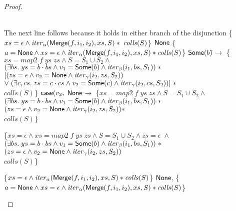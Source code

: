 \begin{proof}
\begin{itemize}
\begin{specification}
\\ \> \>     The next line follows because it holds in either branch of the disjunction 
\nextline \> \{$xs = \epsilon \land \mathit{iter}_\alpha(\mathsf{Merge}(f, i_1, i_2), xs, S)
               * \; \mathit{colls}(S)$\}
\nextline \> $\mathsf{None}$ 
\nextline \> \{$a = \mathsf{None} \land xs = \epsilon \land \mathit{iter}_\alpha(\mathsf{Merge}(f, i_1, i_2), xs, S)
               * \mathit{colls}(S) $\}
\nextline \;\;\;$\mathsf{Some}(b)$\=$ \to $ 
\nextline \> \{$xs = \mathit{map2}\;f\;ys\;zs \land 
                  S = S_1 \cup S_2 \land$ 
\\ \> \>\;\;    $(\exists bs.\; ys = b\cdot bs \land v_1 = \mathsf{Some}(b) \land 
                                \mathit{iter}_\beta(i_1, bs, S_1)) \;*$ 
\\ \> \>\;     $[(zs = \epsilon \land v_2 = \mathsf{None} \land \mathit{iter}_\gamma(i_2, zs, S_2))$ 
\\ \> \>\;\;    $\vee\; (\exists c, cs.\; zs = c\cdot cs \land v_2 = \mathsf{Some}(c) \land 
                                \mathit{iter}_\gamma(i_2, cs, S_2))] \;*$ 
\\ \> \>\;     $\mathit{colls}(S)$\}
\nextline \> $\mathsf{case}(v_2,$ 
\nextline \> \;\;\; $\mathsf{None}$\=$\to$ 
\nextline \> \> \{$xs = \mathit{map2}\;f\;ys\;zs \land 
                  S = S_1 \cup S_2 \land$ 
\\ \> \> \>\;\;    $(\exists bs.\; ys = b\cdot bs \land v_1 = \mathsf{Some}(b) \land 
                                \mathit{iter}_\beta(i_1, bs, S_1)) \;*$
\\ \> \> \>\;     $(zs = \epsilon \land v_2 = \mathsf{None} \land \mathit{iter}_\gamma(i_2, zs, S_2)) *$ 
\\ \> \> \>\;     $\mathit{colls}(S)$\}

\nextline \> \> \{$xs = \epsilon \land xs = \mathit{map2}\;f\;ys\;zs \land 
                  S = S_1 \cup S_2 \land zs = \epsilon \;\land$ 
\\ \> \> \>\;\;    $(\exists bs.\; ys = b\cdot bs \land v_1 = \mathsf{Some}(b) \land 
                                \mathit{iter}_\beta(i_1, bs, S_1)) \;*$
\\ \> \> \>\;     $(zs = \epsilon \land v_2 = \mathsf{None} \land \mathit{iter}_\gamma(i_2, zs, S_2))$ 
\\ \> \> \>\;     $\mathit{colls}(S)$\}

\nextline \> \> \{$xs = \epsilon \land \mathit{iter}_\alpha(\mathsf{Merge}(f, i_1, i_2), xs, S) * 
                   \mathit{colls}(S)$\}
\nextline \> \> $\mathsf{None}$,
\nextline \> \> \{$a = \mathsf{None} \land xs = \epsilon \land \mathit{iter}_\alpha(\mathsf{Merge}(f, i_1, i_2), xs, S) * 
                   \mathit{colls}(S)$\}


\end{specification}
\end{itemize}
\end{proof}
